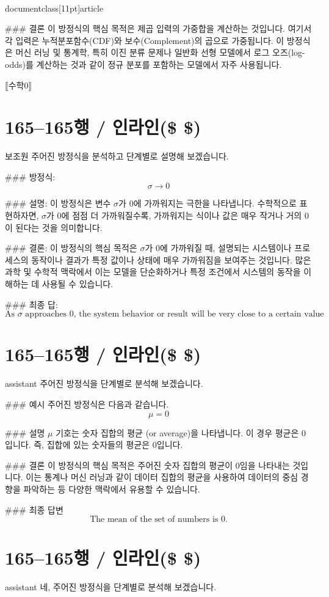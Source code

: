 \\documentclass[11pt]{article}
\begin{document}
### 결론
이 방정식의 핵심 목적은 제곱 입력의 가중합을 계산하는 것입니다. 여기서 각 입력은 누적분포함수(CDF)와 보수(Complement)의 곱으로 가중됩니다. 이 방정식은 머신 러닝 및 통계학, 특히 이진 분류 문제나 일반화 선형 모델에서 로그 오즈(log-odds)를 계산하는 것과 같이 정규 분포를 포함하는 모델에서 자주 사용됩니다.

⟦수학0⟧

\section*{165–165행 / 인라인(\$ \$) }
보조원
주어진 방정식을 분석하고 단계별로 설명해 보겠습니다.

### 방정식:
\[
\sigma \to 0
\]

### 설명:
이 방정식은 변수 \(\sigma\)가 0에 가까워지는 극한을 나타냅니다. 수학적으로 표현하자면, \(\sigma\)가 0에 점점 더 가까워질수록, 가까워지는 식이나 값은 매우 작거나 거의 0이 된다는 것을 의미합니다.

### 결론:
이 방정식의 핵심 목적은 \(\sigma\)가 0에 가까워질 때, 설명되는 시스템이나 프로세스의 동작이나 결과가 특정 값이나 상태에 매우 가까워짐을 보여주는 것입니다. 많은 과학 및 수학적 맥락에서 이는 모델을 단순화하거나 특정 조건에서 시스템의 동작을 이해하는 데 사용될 수 있습니다.

### 최종 답:
\[
\boxed{\text{As } \sigma \text{ approaches 0, the system behavior or result will be very close to a certain value or state.}}
\]

\section*{165–165행 / 인라인(\$ \$) }
assistant
주어진 방정식을 단계별로 분석해 보겠습니다.

### 예시
주어진 방정식은 다음과 같습니다.
\[
\mu = 0
\]

### 설명
\(\mu\) 기호는 숫자 집합의 평균 (or average)을 나타냅니다. 이 경우 평균은 0입니다. 즉, 집합에 있는 숫자들의 평균은 0입니다.

### 결론
이 방정식의 핵심 목적은 주어진 숫자 집합의 평균이 0임을 나타내는 것입니다. 이는 통계나 머신 러닝과 같이 데이터 집합의 평균을 사용하여 데이터의 중심 경향을 파악하는 등 다양한 맥락에서 유용할 수 있습니다.

### 최종 답변
\[
\boxed{\text{The mean of the set of numbers is 0.}}
\]

\section*{165–165행 / 인라인(\$ \$) }
assistant
네, 주어진 방정식을 단계별로 분석해 보겠습니다.
\end{document}
